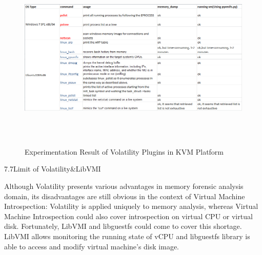 \begin{figure}[htbp]
	\centering
		\includegraphics[width=14cm, height= 9cm ]{Figures/Figure31.png}
	\caption[Experimentation Result of Volatility Plugins in KVM Platform]{Experimentation Result of Volatility Plugins in KVM Platform}
	\label{fig:Experimentation Result of Volatility Plugins in KVM Platform}
\end{figure}

7.7Limit of Volatility\&LibVMI

Although Volatility presents various advantages in memory forensic analysis domain, its disadvantages are still obvious in the context 
of Virtual Machine Introspection: Volatility is applied uniquely to memory analysis, whereas Virtual Machine Introspection could also 
cover introspection on virtual CPU or virtual disk. Fortunately, LibVMI and libguestfs \cite{Reference38} could come to cover this shortage. 
LibVMI allows monitoring the running state of vCPU and libguestfs library is able to access and modify virtual machine’s disk image. 







